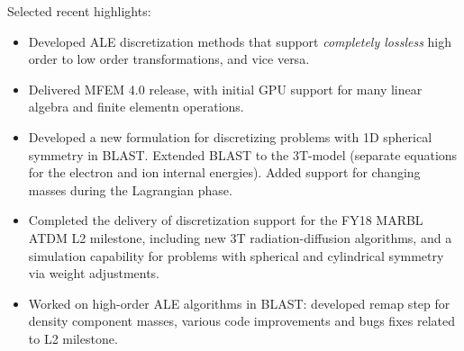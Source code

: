 Selected recent highlights:
\begin{itemize}
\item
Developed ALE discretization methods that support {\it completely lossless}
high order to low order transformations, and vice versa.
\item
Delivered MFEM 4.0 release, with initial GPU support for many linear
algebra and finite elementn operations.
\item
Developed a new formulation for discretizing problems with 1D spherical symmetry
in BLAST. Extended BLAST to the 3T-model (separate equations for the electron
and ion internal energies). Added support for changing masses during the
Lagrangian phase.
\item
Completed the delivery of discretization support for the FY18 MARBL ATDM L2
milestone, including new 3T radiation-diffusion algorithms, and a simulation
capability for problems with spherical and cylindrical symmetry via weight
adjustments.
\item
Worked on high-order ALE algorithms in BLAST: developed remap step for density
component masses, various code improvements and bugs fixes related to L2
milestone.

\end{itemize}
